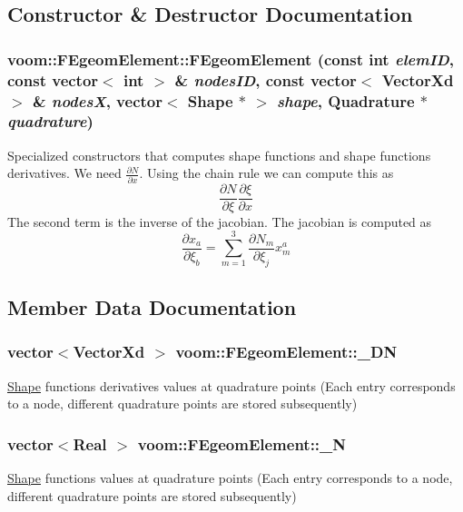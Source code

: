 \subsection{Constructor \& Destructor Documentation}
\hypertarget{classvoom_1_1_f_egeom_element_a13005c4ebd13547328c665e0413a6e35}{
\subsubsection[{FEgeomElement}]{\setlength{\rightskip}{0pt plus 5cm}voom::FEgeomElement::FEgeomElement (const int {\em elemID}, \/  const vector$<$ int $>$ \& {\em nodesID}, \/  const vector$<$ VectorXd $>$ \& {\em nodesX}, \/  vector$<$ {\bf Shape} $\ast$ $>$ {\em shape}, \/  {\bf Quadrature} $\ast$ {\em quadrature})}}
\label{classvoom_1_1_f_egeom_element_a13005c4ebd13547328c665e0413a6e35}
Specialized constructors that computes shape functions and shape functions derivatives. We need $\frac{\partial N}{\partial x} $. Using the chain rule we can compute this as \[ \frac{\partial N}{\partial \xi} \frac{\partial \xi}{\partial x} \] The second term is the inverse of the jacobian. The jacobian is computed as \[ \frac{\partial x_a}{\partial \xi_b} = \sum_{m=1}^{3} \frac{\partial N_m}{\partial \xi_j} x_m^a \] 

\subsection{Member Data Documentation}
\hypertarget{classvoom_1_1_f_egeom_element_a1dd12a09866e90fe8738bcea2267a835}{
\subsubsection[{\_\-DN}]{\setlength{\rightskip}{0pt plus 5cm}vector$<$VectorXd $>$ {\bf voom::FEgeomElement::\_\-DN}}}
\label{classvoom_1_1_f_egeom_element_a1dd12a09866e90fe8738bcea2267a835}
\hyperlink{classvoom_1_1_shape}{Shape} functions derivatives values at quadrature points (Each entry corresponds to a node, different quadrature points are stored subsequently) \hypertarget{classvoom_1_1_f_egeom_element_a944e0317c44621247dc303eecbc1b43f}{
\subsubsection[{\_\-N}]{\setlength{\rightskip}{0pt plus 5cm}vector$<$Real $>$ {\bf voom::FEgeomElement::\_\-N}}}
\label{classvoom_1_1_f_egeom_element_a944e0317c44621247dc303eecbc1b43f}
\hyperlink{classvoom_1_1_shape}{Shape} functions values at quadrature points (Each entry corresponds to a node, different quadrature points are stored subsequently) 

